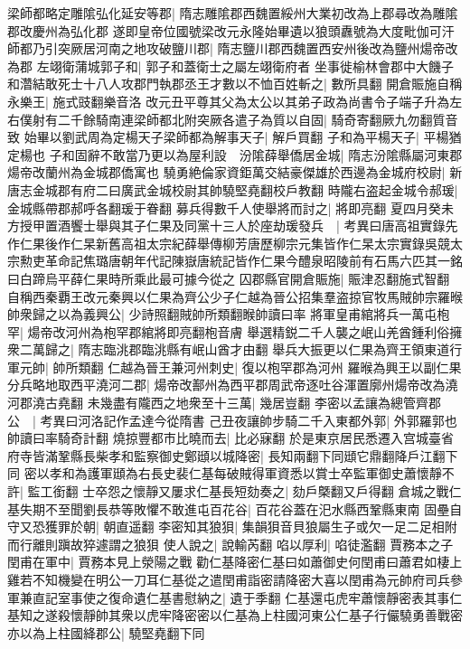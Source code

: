 梁師都略定雕隂弘化延安等郡|{
	隋志雕隂郡西魏置綏州大業初改為上郡尋改為雕隂郡改慶州為弘化郡}
遂即皇帝位國號梁改元永隆始畢遺以狼頭纛號為大度毗伽可汗師都乃引突厥居河南之地攻破鹽川郡|{
	隋志鹽川郡西魏置西安州後改為鹽州煬帝改為郡}
左翊衛蒲城郭子和|{
	郭子和蓋衛士之屬左翊衛府者}
坐事徙榆林會郡中大饑子和濳結敢死士十八人攻郡門執郡丞王才數以不恤百姓斬之|{
	數所具翻}
開倉賑施自稱永樂王|{
	施式豉翻樂音洛}
改元丑平尊其父為太公以其弟子政為尚書令子端子升為左右僕射有二千餘騎南連梁師都北附突厥各遣子為質以自固|{
	騎奇寄翻厥九勿翻質音致}
始畢以劉武周為定楊天子梁師都為解事天子|{
	解戶買翻}
子和為平楊天子|{
	平楊猶定楊也}
子和固辭不敢當乃更以為屋利設　汾隂薛舉僑居金城|{
	隋志汾隂縣屬河東郡煬帝改蘭州為金城郡僑寓也}
驍勇絶倫家資鉅萬交結豪傑雄於西邊為金城府校尉|{
	新唐志金城郡有府二曰廣武金城校尉其帥驍堅堯翻校戶教翻}
時隴右盗起金城令郝瑗|{
	金城縣帶郡郝呼各翻瑗于眷翻}
募兵得數千人使舉將而討之|{
	將即亮翻}
夏四月癸未方授甲置酒饗士舉與其子仁果及同黨十三人於座劫瑗發兵　|{
	考異曰唐高祖實錄先作仁果後作仁杲新舊高祖太宗紀薛舉傳柳芳唐歷柳宗元集皆作仁杲太宗實錄吳競太宗勲吏革命記焦璐唐朝年代記陳嶽唐統記皆作仁果今醴泉昭陵前有石馬六匹其一銘曰白蹄烏平薛仁果時所乘此最可據今從之}
囚郡縣官開倉賑施|{
	賑津忍翻施式智翻}
自稱西秦覇王改元秦興以仁果為齊公少子仁越為晉公招集羣盗掠官牧馬賊帥宗羅㬋帥衆歸之以為義興公|{
	少詩照翻賊帥所類翻睺帥讀曰率}
將軍皇甫綰將兵一萬屯枹罕|{
	煬帝改河州為枹罕郡綰將即亮翻枹音膚}
舉選精鋭二千人襲之岷山羌酋鍾利俗擁衆二萬歸之|{
	隋志臨洮郡臨洮縣有岷山酋才由翻}
舉兵大振更以仁果為齊王領東道行軍元帥|{
	帥所類翻}
仁越為晉王兼河州刺史|{
	復以枹罕郡為河州}
羅㬋為興王以副仁果分兵略地取西平澆河二郡|{
	煬帝改鄯州為西平郡周武帝逐吐谷渾置廓州煬帝改為澆河郡澆古堯翻}
未幾盡有隴西之地衆至十三萬|{
	幾居豈翻}
李密以孟讓為總管齊郡公　|{
	考異曰河洛記作孟達今從隋書}
己丑夜讓帥步騎二千入東都外郭|{
	外郭羅郭也帥讀曰率騎奇計翻}
燒掠豐都市比曉而去|{
	比必寐翻}
於是東京居民悉遷入宫城臺省府寺皆滿鞏縣長柴孝和監察御史鄭頲以城降密|{
	長知兩翻下同頲它鼎翻降戶江翻下同}
密以孝和為護軍頲為右長史裴仁基每破賊得軍資悉以賞士卒監軍御史蕭懷靜不許|{
	監工銜翻}
士卒怨之懷靜又屢求仁基長短劾奏之|{
	劾戶槩翻又戶得翻}
倉城之戰仁基失期不至聞劉長恭等敗懼不敢進屯百花谷|{
	百花谷蓋在汜水縣西鞏縣東南}
固壘自守又恐獲罪於朝|{
	朝直遥翻}
李密知其狼狽|{
	集韻狽音貝狼屬生子或欠一足二足相附而行離則蹎故猝遽謂之狼狽}
使人說之|{
	說輸芮翻}
啗以厚利|{
	啗徒濫翻}
賈務本之子閏甫在軍中|{
	賈務本見上滎陽之戰}
勸仁基降密仁基曰如蕭御史何閏甫曰蕭君如棲上雞若不知機變在明公一刀耳仁基從之遣閏甫詣密請降密大喜以閏甫為元帥府司兵參軍兼直記室事使之復命遺仁基書慰納之|{
	遺于季翻}
仁基還屯虎牢蕭懷靜密表其事仁基知之遂殺懷靜帥其衆以虎牢降密密以仁基為上柱國河東公仁基子行儼驍勇善戰密亦以為上柱國絳郡公|{
	驍堅堯翻下同}
